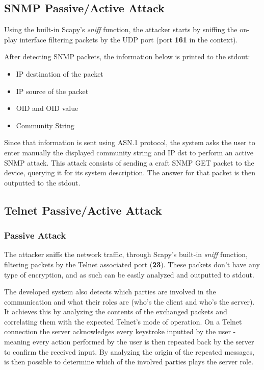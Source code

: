 \subsection{SNMP Passive/Active Attack}

Using the built-in Scapy's \textit{sniff} function, the attacker starts by sniffing the on-play interface filtering packets by the UDP port (port \textbf{161} in the context). 

After detecting SNMP packets, the information below is printed to the stdout:
\begin{itemize}
    \item IP destination of the packet
    \item IP source of the packet
    \item OID and OID value
    \item Community String
\end{itemize}
Since that information is sent using ASN.1 protocol, the system asks the user to enter manually the displayed community string and IP dst to perform an active SNMP attack. This attack consists of sending a craft SNMP GET packet to the device, querying it for its system description. The answer for that packet is then outputted to the stdout.

\subsection{Telnet Passive/Active Attack}
\subsubsection{Passive Attack}

The attacker sniffs the network traffic, through Scapy's built-in \textit{sniff}
function, filtering packets by the Telnet associated port (\textbf{23}). 
These packets don't have any type of encryption, and as such can be easily 
analyzed and outputted to stdout.

The developed system also detects which parties are involved in the 
communication and what their roles are (who's the client and who's the server).
It achieves this by analyzing the contents of the exchanged packets and 
correlating them with the expected Telnet's mode of operation.
On a Telnet connection the server acknowledges every keystroke 
inputted by the user - meaning every action performed by the user is then 
repeated back by the server to confirm the received input.
By analyzing the origin of the repeated messages, is then possible to determine
which of the involved parties plays the 
server role. 

